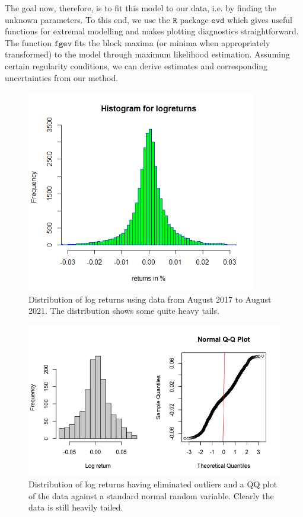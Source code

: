\documentclass[twoside]{report}
\newcommand{\code}{\texttt}
\begin{document}
\begin{spacing}{1}
The goal now, therefore, is to fit this model to our data, i.e. by finding the unknown parameters. To this end, we use the $\code{R}$ package $\code{evd}$ which gives useful functions for extremal modelling and makes plotting diagnostics straightforward. The function $\code{fgev}$ fits the block maxima (or minima when appropriately transformed) to the model through maximum likelihood estimation. Assuming certain regularity conditions, we can derive estimates and corresponding uncertainties from our method.  
\begin{figure}
    \centering
    \includegraphics[width=\linewidth, height=3.5in]{TestPlots/Histogram log-returns2.png}
    \caption{Distribution of log returns using data from August 2017 to August 2021. The distribution shows some quite heavy tails.}
    \label{fig:hist_logreturn_17_21}
\end{figure}

\begin{figure}
    \centering
    \includegraphics[width=\linewidth]{Extremal Modelling/distplots_sans_outliers.png}
    \caption{Distribution of log returns having eliminated outliers and a QQ plot of the data against a standard normal random variable. Clearly the data is still heavily tailed.}
    \label{fig:distplots_sans_outliers}
\end{figure}










\end{spacing}
\end{document}
